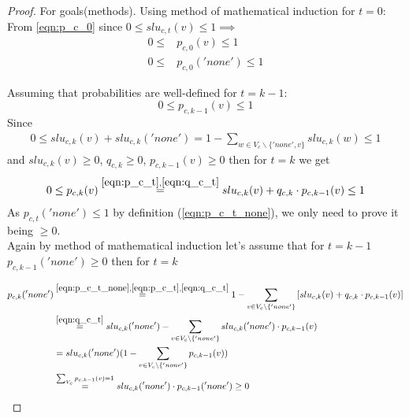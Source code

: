 \documentclass[12pt,titlepage,a4paper]{article}
\begin{document}
\begin{proof}
    For goals(methods).
    Using method of mathematical induction for $t=0$: \\
    From \ref{eqn:p_c_0} since $0 \leq slu_{c,t}(v) \leq 1 \implies $
    \begin{equation}
        \begin{aligned}
            0 \leq &p_{c,0}(v) \leq 1 \\
            0 \leq &p_{c, 0}('none') \leq 1
        \end{aligned}
    \end{equation}

    \noindent Assuming that probabilities are well-defined for $t = k-1$:
    \begin{equation}
        0 \leq p_{c,k-1}(v) \leq 1
    \end{equation} 
    Since
    \begin{equation}
        \begin{aligned}
            0 \leq slu_{c,k}(v) + slu_{c,k}('none') = 1 - \sum_{w \in V_{c} \backslash \{'none', v\}} slu_{c,k}(w) \leq 1
        \end{aligned}
    \end{equation}
    and
    $ slu_{c,k}(v) \geq 0 $,  $q_{c,k} \geq 0$, $p_{c,k-1}(v) \geq 0$
    then for $t=k$ we get
    \begin{equation}
        \begin{aligned}
            0 \leq p_{c, k}(v) \overset{
                \mathrm{\ref{eqn:p_c_t}}, 
                \mathrm{\ref{eqn:q_c_t}}
                }{=} slu_{c,k}(v) + q_{c,k} \cdot p_{c, k-1}(v) \leq 1
        \end{aligned}
    \end{equation}
    As $p_{c, t}('none') \leq 1$ by definition (\ref{eqn:p_c_t_none}), we only need to prove it being $\geq 0$.\\
    
    \noindent Again by method of mathematical induction let's assume that for $t = k-1$ $p_{c, k-1}('none') \geq 0$ then for $t = k$

    \begin{equation}
        \begin{aligned}
            p_{c,k}('none') 
            &\overset{
                \mathrm{\ref{eqn:p_c_t_none}},
                \mathrm{\ref{eqn:p_c_t}}, 
                \mathrm{\ref{eqn:q_c_t}}
                }{=} 1 - \sum_{v \in V_{c} \backslash \{'none'\}} \left[ slu_{c,k}(v) + q_{c,k} \cdot p_{c,k-1}(v) \right] \\ 
            &\overset{
                \mathrm{\ref{eqn:q_c_t}}
                }{=} slu_{c,k}('none') - \sum_{v \in V_{c} \backslash \{'none'\}} slu_{c,k}('none') \cdot p_{c,k-1}(v) \\ 
            &= slu_{c,k}('none')(1 - \sum_{v \in V_{c} \backslash \{'none'\}}p_{c, k-1}(v)) 
            \\
            &\overset{\sum_{V_c}p_{c, k-1}(v) = 1}{=} slu_{c,k}('none') \cdot p_{c, k-1}('none') \geq 0
        \end{aligned}
    \end{equation}


\end{proof}
\end{document}
